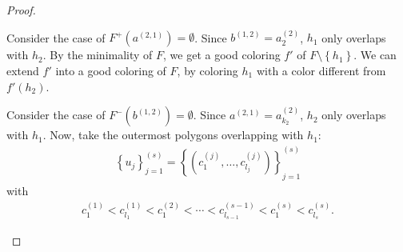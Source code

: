 \documentclass[12pt]{article}
\theoremstyle{definition}
\def\rxhalf{0.5/2}
\def\ryhalf{0.4/2}
\def\rxfourpoint{4.5/2}
\def\ryfourpoint{2.3/2}
\def\rxfivepoint{5.5/2}
\def\ryfivepoint{3.0/2}
\begin{document}
\begin{proof}
\begin{itemize}
\begin{figure}[ht]
\begin{center}
{
             }
             \end{center}
             \caption{}
             \label{figure:t=2}
             \end{figure}
             
             Consider the case of
             $F^{+}\left(a^{\left(2, 1\right)}\right) = \emptyset$.
             Since $b^{\left(1, 2\right)} =
             a_{2}^{\left(2\right)}$, $h_1$ only
             overlaps with $h_2$.
             By the minimality of $F$, 
             we get a good coloring 
             $f'$ of $F \setminus \left\{h_1\right\}$.
             We can extend $f'$ into 
             a good coloring of $F$,
             by coloring $h_1$ with 
             a color different from
             $f'\left(h_2\right)$.

             Consider the case of
             $F^{-}\left(b^{\left(1, 2\right)}\right) = \emptyset$.
             Since $a^{\left(2, 1\right)} = 
             a_{k_2}^{\left(2\right)}$,
             $h_2$ only overlaps with $h_1$.
             Now, take the outermost polygons
             overlapping with $h_1$:
             \begin{gather*}
                 \left\{u_{j}\right\}_{j = 1}^{\left(s\right)} = 
                 \left\{\left(c_1^{\left(j\right)}, \ldots,
                 c_{l_{j}}^{\left(j\right)}\right)\right\}_{j = 1}^{\left(s\right)}
             \end{gather*}
             with
             \begin{gather*}
                 c_1^{\left(1\right)} <
                 c_{l_1}^{\left(1\right)} <
                 c_1^{\left(2\right)} < 
                 \cdots <
                 c_{l_{s-1}}^{\left(s- 1\right)} <
                 c_1^{\left(s\right)} <
                 c_{l_{s}}^{\left(s\right)}.
             \end{gather*}


\end{itemize}
\end{proof}
\end{document}
